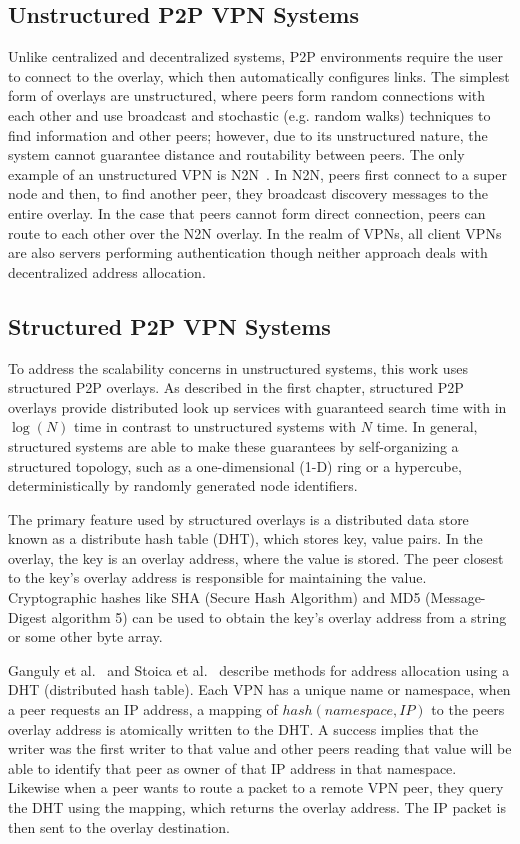 \subsection{Unstructured P2P VPN Systems} Unlike centralized and decentralized
systems, P2P environments require the user to connect to the overlay, which
then automatically configures links.  The simplest form of overlays are
unstructured, where peers form random connections with each other and use
broadcast and stochastic (e.g. random walks) techniques to find information and
other peers; however, due to its unstructured nature, the system cannot
guarantee distance and routability between peers.  The only example of an
unstructured VPN is N2N~\cite{n2n}.  In N2N, peers first connect to a super
node and then, to find another peer, they broadcast discovery messages to the
entire overlay.  In the case that peers cannot form direct connection, peers
can route to each other over the N2N overlay.  In the realm of VPNs, all client
VPNs are also servers performing authentication though neither approach deals
with decentralized address allocation.

\subsection{Structured P2P VPN Systems}

To address the scalability concerns in unstructured systems, this work uses
structured P2P overlays.  As described in the first chapter, structured P2P
overlays provide distributed look up services with guaranteed search time with
in $\log(N)$ time in contrast to unstructured systems with $N$ time.  In
general, structured systems are able to make these guarantees by
self-organizing a structured topology, such as a one-dimensional (1-D) ring or
a hypercube, deterministically by randomly generated node identifiers.

The primary feature used by structured overlays is a distributed data store
known as a distribute hash table (DHT), which stores key, value pairs.  In the
overlay, the key is an overlay address, where the value is stored.  The peer
closest to the key's overlay address is responsible for maintaining the value.
Cryptographic hashes like SHA (Secure Hash Algorithm) and MD5 (Message-Digest
algorithm 5) can be used to obtain the key's overlay address from a string or
some other byte array.

Ganguly et al.~\cite{pcgrid07} and Stoica et al.~\cite{i3} describe methods for
address allocation using a DHT (distributed hash table).  Each VPN has a unique
name or namespace, when a peer requests an IP address, a mapping of
$hash(namespace, IP)$ to the peers overlay address is atomically written to the
DHT.  A success implies that the writer was the first writer to that value and
other peers reading that value will be able to identify that peer as owner of
that IP address in that namespace.  Likewise when a peer wants to route a
packet to a remote VPN peer, they query the DHT using the mapping, which
returns the overlay address.  The IP packet is then sent to the overlay
destination.

